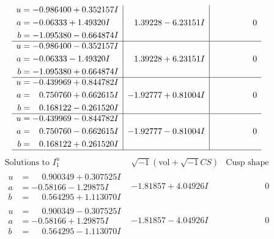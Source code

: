 \documentclass[1p]{elsarticle_modified}
\theoremstyle{definition}
\newcommand{\I}{\sqrt{-1}}
\begin{document}
$$\begin{array}{c|c|c}
\begin{aligned}
u &= -0.986400 + 0.352157 I \\
a &= -0.06333 + 1.49320 I \\
b &= -1.095380 - 0.664874 I\end{aligned}
 & \phantom{-}1.39228 - 6.23151 I & \phantom{-0.000000 } 0 \\ \hline\begin{aligned}
u &= -0.986400 - 0.352157 I \\
a &= -0.06333 - 1.49320 I \\
b &= -1.095380 + 0.664874 I\end{aligned}
 & \phantom{-}1.39228 + 6.23151 I & \phantom{-0.000000 } 0 \\ \hline\begin{aligned}
u &= -0.439969 + 0.844782 I \\
a &= \phantom{-}0.750760 + 0.662615 I \\
b &= \phantom{-}0.168122 - 0.261520 I\end{aligned}
 & -1.92777 + 0.81004 I & \phantom{-0.000000 } 0 \\ \hline\begin{aligned}
u &= -0.439969 - 0.844782 I \\
a &= \phantom{-}0.750760 - 0.662615 I \\
b &= \phantom{-}0.168122 + 0.261520 I\end{aligned}
 & -1.92777 - 0.81004 I & \phantom{-0.000000 } 0\\
 \hline 
 \end{array}$$\newpage$$\begin{array}{c|c|c}  
\text{Solutions to }I^u_{1}& \I (\text{vol} + \sqrt{-1}CS) & \text{Cusp shape}\\
 \hline 
\begin{aligned}
u &= \phantom{-}0.900349 + 0.307525 I \\
a &= -0.58166 - 1.29875 I \\
b &= \phantom{-}0.564295 + 1.113070 I\end{aligned}
 & -1.81857 + 4.04926 I & \phantom{-0.000000 } 0 \\ \hline\begin{aligned}
u &= \phantom{-}0.900349 - 0.307525 I \\
a &= -0.58166 + 1.29875 I \\
b &= \phantom{-}0.564295 - 1.113070 I\end{aligned}
 & -1.81857 - 4.04926 I & \phantom{-0.000000 } 0 \\ \hline\begin{aligned}

\end{aligned}
\end{array}$$
\end{document}
